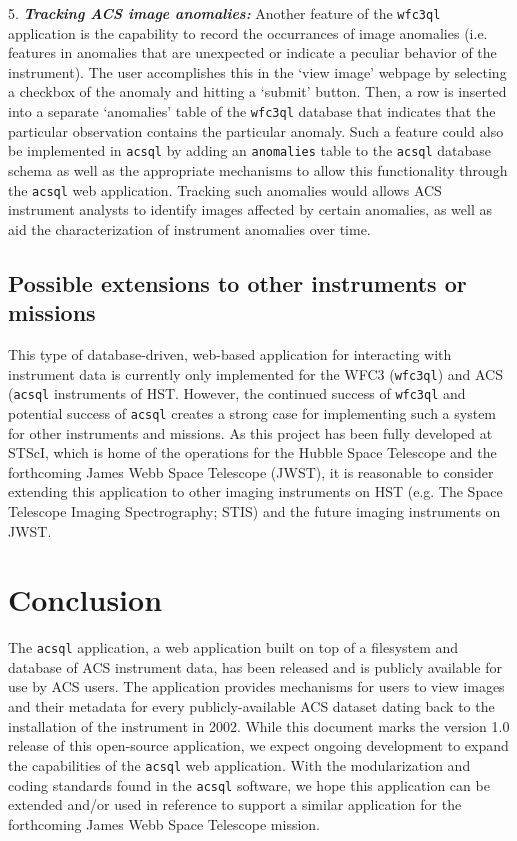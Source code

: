 \documentclass[10pt,journal,compsoc]{IEEEtran}
\begin{document}
5. \textbf{\textit{Tracking ACS image anomalies:}}  Another feature of the \texttt{wfc3ql} application is the capability to record the occurrances of image anomalies (i.e. features in anomalies that
are unexpected or indicate a peculiar behavior of the instrument).  The user accomplishes this in the `view image' webpage by selecting a checkbox of the anomaly and hitting a `submit' button.  Then,
a row is inserted into a separate `anomalies' table of the \texttt{wfc3ql} database that indicates that the particular observation contains the particular anomaly.  Such a feature could also be implemented
in \texttt{acsql} by adding an \texttt{anomalies} table to the \texttt{acsql} database schema as well as the appropriate mechanisms to allow this functionality through the \texttt{acsql} web application.
Tracking such anomalies would allows ACS instrument analysts to identify images affected by certain anomalies, as well as aid the characterization of instrument anomalies over time.


\subsection{Possible extensions to other instruments or missions} \label{sec5.2}

This type of database-driven, web-based application for interacting with instrument data is currently only implemented for the WFC3 (\texttt{wfc3ql}) and ACS (\texttt{acsql} instruments of HST.  However, the
continued success of \texttt{wfc3ql} and potential success of \texttt{acsql} creates a strong case for implementing such a system for other instruments and missions.  As this project has been fully
developed at STScI, which is home of the operations for the Hubble Space Telescope and the forthcoming James Webb Space Telescope (JWST), it is reasonable to consider extending this application to other imaging
instruments on HST (e.g. The Space Telescope Imaging Spectrography; STIS) and the future imaging instruments on JWST.


\section{Conclusion} \label{chap6}
The \texttt{acsql} application, a web application built on top of a filesystem and database of ACS instrument data, has been released and is publicly available for use by ACS users.  The
application provides mechanisms for users to view images and their metadata for every publicly-available ACS dataset dating back to the installation of the instrument in 2002.  While this document marks
the version 1.0 release of this open-source application, we expect ongoing development to expand the capabilities of the \texttt{acsql} web application.  With the modularization and
coding standards found in the \texttt{acsql} software, we hope this application can be extended and/or used in reference to support a similar application for the forthcoming James Webb Space
Telescope mission.
\end{document}

